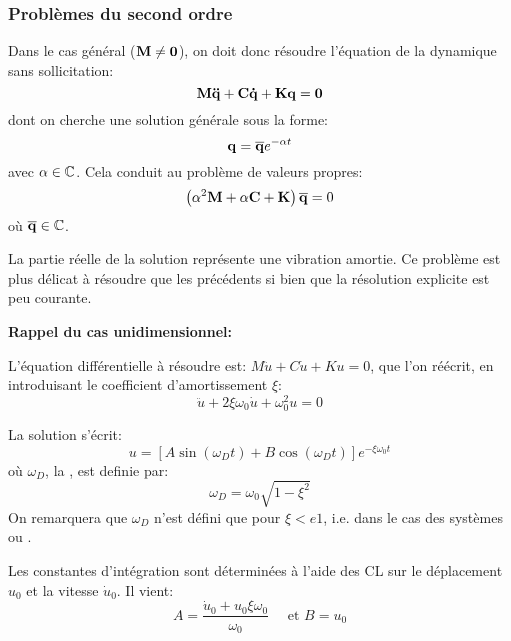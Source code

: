 \subsubsection{Problèmes du second ordre}

Dans le cas général ($\mathbf{M}\ne\mathbf{0}$), on doit donc résoudre l'équation de la dynamique 
sans sollicitation:
\begin{equation} \mathbf{M}\mathbf{\ddot{q}}+\mathbf{C}\mathbf{\dot{q}}+\mathbf{K}\mathbf{q}=\mathbf{0} \end{equation}
dont on cherche une solution générale sous la forme:
\begin{equation} \mathbf{q}=\mathbf{\overline{q}}e^{-\alpha t} \end{equation}
avec $\alpha\in\mathbb C$.
Cela conduit au problème de valeurs propres:
\begin{equation} \left(\alpha^2\mathbf{M}+\alpha\mathbf{C}+\mathbf{K}\right)\mathbf{\overline{q}}=0\end{equation}
où $\mathbf{\overline{q}}\in\mathbb C$.

La partie réelle de la solution représente une vibration amortie. 
Ce problème est plus délicat à résoudre que les précédents si bien que la résolution 
explicite est peu courante.

\medskip
{}
\textbf{Rappel du cas unidimensionnel:}

L'équation différentielle à résoudre est: $M\ddot{u}+C\dot{u}+Ku=0$, que l'on
réécrit, en introduisant le coefficient d'amortissement $\xi$: 
\begin{equation}\ddot{u}+2\xi\omega_0\dot{u}+\omega^2_0 u=0\end{equation}

La solution s'écrit: \begin{equation} u=\left[A\sin (\omega_D t)+B\cos(\omega_D t)\right] e^{-\xi\omega_0t} \end{equation}
où $\omega_D$, la , est definie par:
\begin{equation}\omega_D=\omega_0\sqrt{1-\xi^2}\end{equation}
On remarquera que $\omega_D$ n'est défini que pour $\xi<e1$, i.e.
dans le cas des systèmes  ou .

Les constantes d'intégration sont déterminées à l'aide des CL sur le déplacement $u_0$ et la
vitesse $\dot{u}_0$. Il vient: \begin{equation} A=\dfrac{\dot{u}_0+u_0\xi\omega_0}{\omega_0} \quad \text{ et } B=u_0\end{equation}

